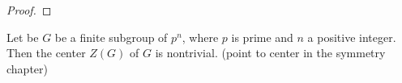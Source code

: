 \begin{proof}
{%


}%
\end{proof}
\begin{lemma}
  \label{lem:nontrivcenter}
  Let be $G$ be a finite subgroup of \gporder $p^n$, where $p$ is prime and $n$ a positive integer.
Then the center $Z(G)$ of $G$ is nontrivial.
(point to center in the symmetry chapter)
\end{lemma}
